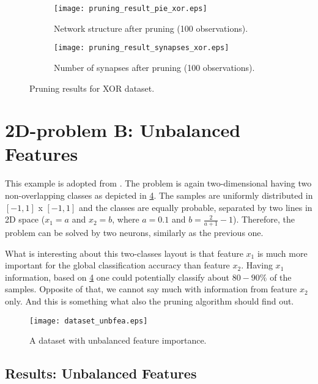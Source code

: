\begin{figure}[H]
\centering
\begin{subfigure}{.4\textwidth}
  \centering
  \texttt{[image: pruning\_result\_pie\_xor.eps]}
  \caption{Network structure after pruning (100 observations).}
  \label{fig:examples:pie_xor}
\end{subfigure}
\begin{subfigure}{.4\textwidth}
  \centering
  \texttt{[image: pruning\_result\_synapses\_xor.eps]}
  \caption{Number of synapses after pruning (100 observations).}
  \label{fig:examples:result_synapses_xor}
\end{subfigure}
\caption{Pruning results for XOR dataset.}
\label{fig:examples:pruning_result_xor}
\end{figure}

\section{2D-problem B: Unbalanced Features} \label{sec:dataset_unbfea}
This example is adopted from \citep{karnin}. The problem is again two-dimensional having two non-overlapping classes as depicted in \cref{fig:examples:dataset_unbfea}. The samples are uniformly distributed in $ [-1, 1] $ x $ [-1, 1] $ and the classes are equally probable, separated by two lines in 2D space ($ x_1 = a $ and $ x_2 = b $, where $ a = 0.1 $ and $ b = \frac{2}{a+1} - 1 $). Therefore, the problem can be solved by two neurons, similarly as the previous one.

What is interesting about this two-classes layout is that feature $ x_1 $ is much more important for the global classification accuracy than feature $ x_2 $. Having $ x_1 $ information, based on \cref{fig:examples:dataset_unbfea} one could potentially classify about $ 80-90\% $ of the samples. Opposite of that, we cannot say much with information from feature $ x_2 $ only. And this is something what also the pruning algorithm should find out.

\begin{figure}[H]
\centering
\texttt{[image: dataset\_unbfea.eps]}
\caption{A dataset with unbalanced feature importance.}
\label{fig:examples:dataset_unbfea}
\end{figure}

\subsection*{Results: Unbalanced Features}


